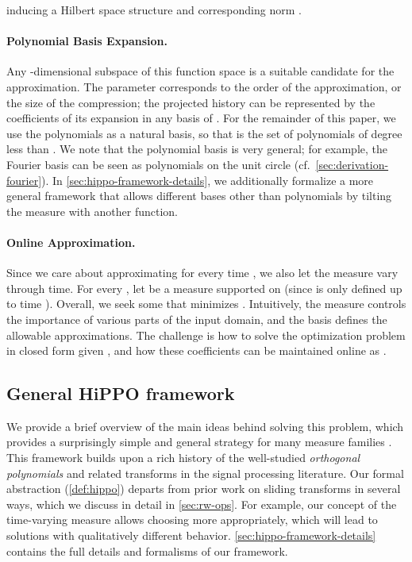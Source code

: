 \documentclass{article}
\begin{document}
inducing a Hilbert space structure  and corresponding norm .

\paragraph{Polynomial Basis Expansion.}
Any -dimensional subspace  of this function space is a suitable candidate for the approximation.
The parameter  corresponds to the order of the approximation, or the size of the compression;
the projected history can be represented by the  coefficients of its expansion in any basis of .
For the remainder of this paper, we use the polynomials as a natural basis, so that  is the set of polynomials of degree less than .
We note that the polynomial basis is very general; for example, the Fourier basis  can be seen as polynomials on the unit circle  (cf.\ \cref{sec:derivation-fourier}).
In \cref{sec:hippo-framework-details}, we additionally formalize a more
general framework that allows different bases other than polynomials by tilting the measure with another function.

\paragraph{Online Approximation.}
Since we care about approximating  for every time , we also let the measure vary through time.
For every , let  be a measure supported on  (since  is only defined up to time ).
Overall, we seek some  that minimizes .
Intuitively, the measure  controls the importance of various parts of the input domain,
and the basis defines the allowable approximations.
The challenge is how to solve the optimization problem in closed form given ,
and how these coefficients can be maintained online as .




\subsection{General HiPPO framework}
\label{subsec:hippo-framework}

We provide a brief overview of the main ideas behind solving this problem, which provides a surprisingly simple and general strategy for many measure families .
This framework builds upon a rich history of the well-studied \emph{orthogonal polynomials} and related transforms in the signal processing literature.
Our formal abstraction (\cref{def:hippo}) departs from prior work on sliding transforms in several ways, which we discuss in detail in \cref{sec:rw-ops}.
For example, our concept of the time-varying measure allows choosing  more appropriately, which will lead to solutions with qualitatively different behavior.
\cref{sec:hippo-framework-details} contains the full details and formalisms of our framework.
\end{document}
